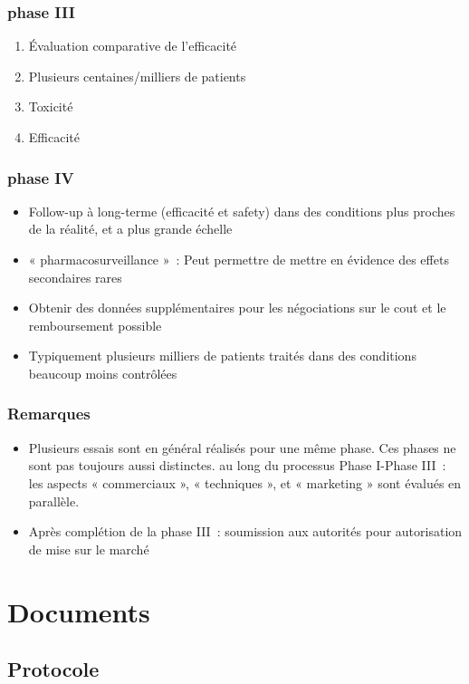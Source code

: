 \subsubsection{phase III}

\begin{enumerate}
    \item  Évaluation comparative de l’efficacité
    \item Plusieurs centaines/milliers de patients
    \item Toxicité
    \item Efficacité
\end{enumerate}

\subsubsection{phase IV}
\begin{itemize}
    \item Follow-up à long-terme (efficacité et safety) dans des conditions plus proches de la réalité, et a plus grande échelle
    \item « pharmacosurveillance » : Peut permettre de mettre en évidence des effets
secondaires rares
    \item Obtenir des données supplémentaires pour les négociations sur le cout et le remboursement possible
    \item Typiquement plusieurs milliers de patients traités dans des conditions beaucoup moins contrôlées
\end{itemize}
\subsubsection{Remarques}
\begin{itemize}
    \item Plusieurs essais sont en général réalisés pour une même phase. Ces phases ne sont pas toujours aussi distinctes.
    \itemTout au long du processus Phase I-Phase III : les aspects « commerciaux », « techniques », et « marketing » sont évalués en parallèle.
\item Après complétion de la phase III : soumission aux autorités pour autorisation de mise sur le marché
\end{itemize}
\section{Documents}

\subsection{Protocole}

